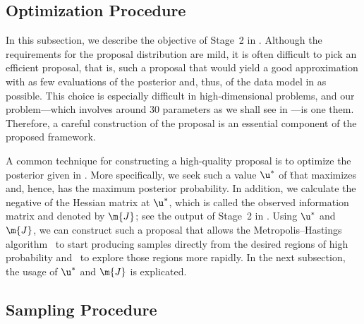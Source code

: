 \subsection{Optimization Procedure}

In this subsection, we describe the objective of Stage~2 in
. Although the requirements for the proposal
distribution are mild, it is often difficult to pick an efficient proposal, that
is, such a proposal that would yield a good approximation with as few
evaluations of the posterior and, thus, of the data model in
 as possible. This choice is especially difficult in
high-dimensional problems, and our problem---which involves around 30 parameters
as we shall see in ---is one them. Therefore, a careful
construction of the proposal is an essential component of the proposed
framework.

A common technique for constructing a high-quality proposal is to optimize the
posterior given in . More specifically, we seek such a
value $\u^*$ of \u that maximizes  and, hence, has the
maximum posterior probability. In addition, we calculate the negative of the
Hessian matrix at $\u^*$, which is called the observed information matrix and
denoted by $\m{J}$; see the output of Stage~2 in .
Using $\u^*$ and $\m{J}$, we can construct such a proposal that allows the
Metropolis--Hastings algorithm \one~to start producing samples directly from the
desired regions of high probability and \two~to explore those regions more
rapidly. In the next subsection, the usage of $\u^*$ and $\m{J}$ is explicated.

\subsection{Sampling Procedure}

